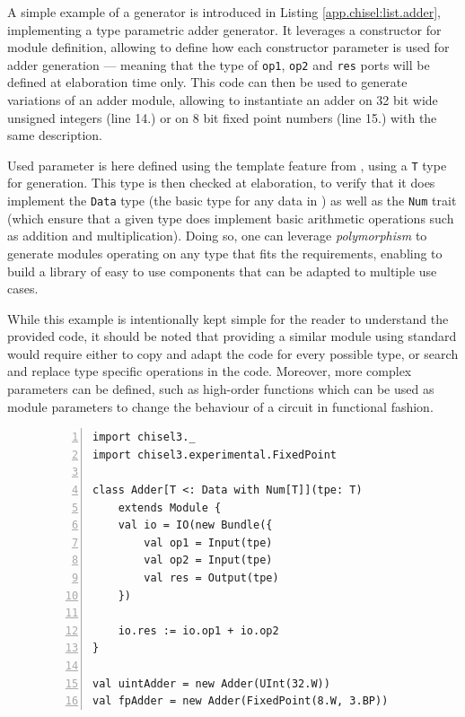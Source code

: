             A simple example of a \chisel{} generator is introduced in Listing \ref{app.chisel:list.adder}, implementing a type parametric adder generator.
            It leverages a \scala{} constructor for module definition, allowing to define how each constructor parameter is used for adder generation --- meaning that the type of \lstinline{op1}, \lstinline{op2} and \lstinline{res} ports will be defined at elaboration time only. %
            This code can then be used to generate variations of an adder module, allowing to instantiate an adder on 32 bit wide unsigned integers (line 14.) or on 8 bit fixed point numbers (line 15.) with the same description.

            Used parameter is here defined using the template feature from \scala, using a \lstinline{T} type for generation.
            This type is then checked at elaboration, to verify that it does implement the \lstinline{Data} type (the basic type for any data in \chisel) as well as the \lstinline{Num} trait (which ensure that a given type does implement basic arithmetic operations such as addition and multiplication).
            Doing so, one can leverage {\it polymorphism} to generate modules operating on any type that fits the requirements, enabling to build a library of easy to use components that can be adapted to multiple use cases.

            While this example is intentionally kept simple for the reader to understand the provided code, it should be noted that providing a similar module using standard  would require either to copy and adapt the code for every possible type, or search and replace type specific operations in the code.
            Moreover, more complex parameters can be defined, such as high-order functions which can be used as module parameters to change the behaviour of a circuit in functional fashion.

            \begin{figure}[h!]
                \begin{lstlisting}[numbers=left,stepnumber=1,
                                   caption={Type parametric adder generator in \chiselT},
                                   label={app.chisel:list.adder}]
import chisel3._
import chisel3.experimental.FixedPoint

class Adder[T <: Data with Num[T]](tpe: T)
    extends Module {
    val io = IO(new Bundle({
        val op1 = Input(tpe)
        val op2 = Input(tpe)
        val res = Output(tpe)
    })

    io.res := io.op1 + io.op2
}   

val uintAdder = new Adder(UInt(32.W))
val fpAdder = new Adder(FixedPoint(8.W, 3.BP))\end{lstlisting}
            \end{figure}

